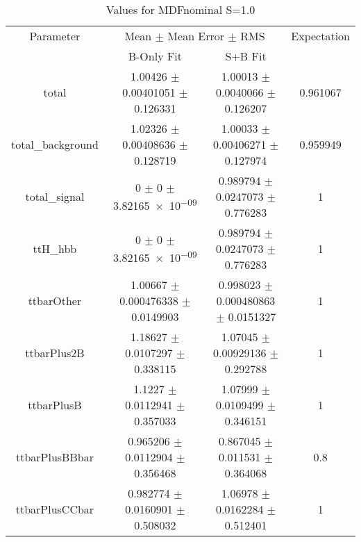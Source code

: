 \begin{table}
\centering
\caption{Values for MDFnominal S=1.0}
\begin{tabular}{cccc}
\toprule
Parameter & \multicolumn{2}{c}{Mean $\pm$ Mean Error $\pm$ RMS} & Expectation\\
 & B-Only Fit & S+B Fit & \\
\midrule
total & \num{1.00426} $\pm$ \num{0.00401051} $\pm$ \num{0.126331} & \num{1.00013} $\pm$ \num{0.0040066} $\pm$ \num{0.126207} & \num{0.961067}\\
total\_background & \num{1.02326} $\pm$ \num{0.00408636} $\pm$ \num{0.128719} & \num{1.00033} $\pm$ \num{0.00406271} $\pm$ \num{0.127974} & \num{0.959949}\\
total\_signal & \num{0} $\pm$ \num{0} $\pm$ \num{3.82165e-09} & \num{0.989794} $\pm$ \num{0.0247073} $\pm$ \num{0.776283} & \num{1}\\
ttH\_hbb & \num{0} $\pm$ \num{0} $\pm$ \num{3.82165e-09} & \num{0.989794} $\pm$ \num{0.0247073} $\pm$ \num{0.776283} & \num{1}\\
ttbarOther & \num{1.00667} $\pm$ \num{0.000476338} $\pm$ \num{0.0149903} & \num{0.998023} $\pm$ \num{0.000480863} $\pm$ \num{0.0151327} & \num{1}\\
ttbarPlus2B & \num{1.18627} $\pm$ \num{0.0107297} $\pm$ \num{0.338115} & \num{1.07045} $\pm$ \num{0.00929136} $\pm$ \num{0.292788} & \num{1}\\
ttbarPlusB & \num{1.1227} $\pm$ \num{0.0112941} $\pm$ \num{0.357033} & \num{1.07999} $\pm$ \num{0.0109499} $\pm$ \num{0.346151} & \num{1}\\
ttbarPlusBBbar & \num{0.965206} $\pm$ \num{0.0112904} $\pm$ \num{0.356468} & \num{0.867045} $\pm$ \num{0.011531} $\pm$ \num{0.364068} & \num{0.8}\\
ttbarPlusCCbar & \num{0.982774} $\pm$ \num{0.0160901} $\pm$ \num{0.508032} & \num{1.06978} $\pm$ \num{0.0162284} $\pm$ \num{0.512401} & \num{1}\\
\bottomrule
\end{tabular}
\end{table}